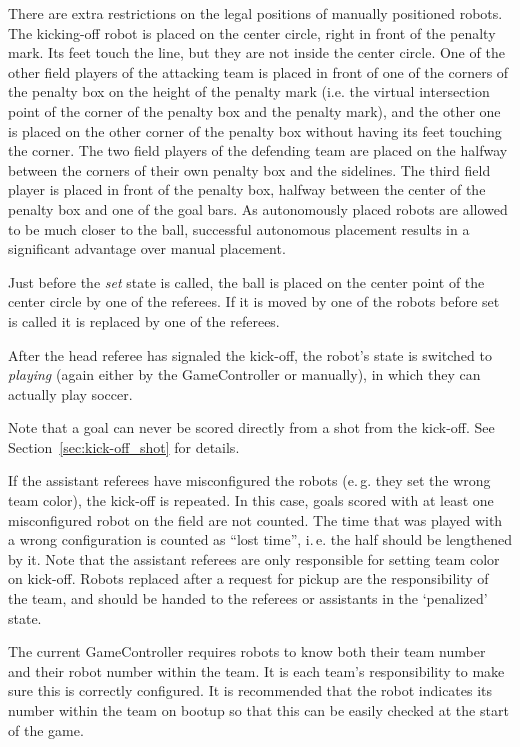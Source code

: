 \documentclass[12pt]{article}
\newcommand{\ie}{\mbox{i.\,e.}\xspace}
\newcommand{\eg}{\mbox{e.\,g.}\xspace}
\begin{document}
There are extra restrictions on the legal positions of manually positioned robots. The kicking-off robot is placed on the center circle, right in front of the penalty mark. Its feet touch the line, but they are not inside the center circle. 
One of the other field players of the attacking team is placed in front of one of the corners of the penalty box on the height of the penalty mark (i.e. the virtual intersection point of the corner of the penalty box and the penalty mark), and the other one is placed on the other corner of the penalty box without having its feet touching the corner. 
The two field players of the defending team are placed on the halfway between the corners of their own penalty box and the sidelines. The third field player is placed in front of the penalty box, halfway between the center of the penalty box and one of the goal bars.
As autonomously placed robots are allowed to be much closer to the ball, successful autonomous placement results in a significant advantage over manual placement.

Just before the \emph{set} state is called, the ball is placed on the center point of the center circle by one of the referees. If it is moved by one of the robots before set is called it is replaced by one of the referees.

After the head referee has signaled the kick-off, the robot's state is switched to \emph{playing} (again either by the GameController or manually), in which they can actually play soccer.

Note that a goal can never be scored directly from a shot from the kick-off. See Section~\ref{sec:kick-off_shot} for details.

If the assistant referees have misconfigured the robots (\eg they set the wrong team color), the kick-off is repeated. In this case, goals scored with at least one misconfigured robot on the field are not counted. The time that was played with a wrong configuration is counted as ``lost time'', \ie the half should be lengthened by it. Note that the assistant referees are only responsible for setting team color on kick-off. Robots replaced after a request for pickup are the responsibility of the team, and should be handed to the referees or assistants in the `penalized' state.

The current GameController requires robots to know both their team number and their robot number within the team. It is each team's responsibility to make sure this is correctly configured. It is recommended that the robot indicates its number within the team on bootup so that this can be easily checked at the start of the game.
\end{document}
